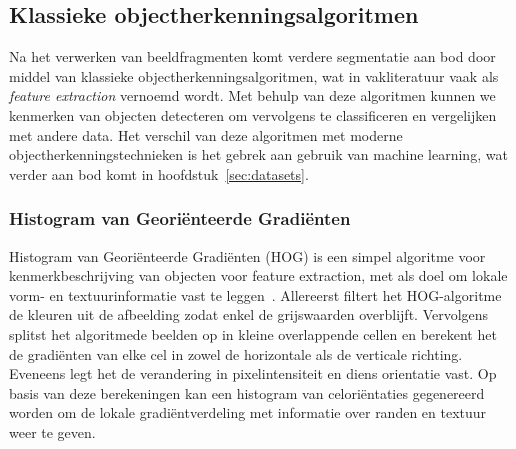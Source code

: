 
\subsection{Klassieke objectherkenningsalgoritmen}
\label{subsec:klassieke-objectherkenningsalgoritmen}
Na het verwerken van beeldfragmenten komt verdere segmentatie aan bod door middel van klassieke objectherkenningsalgoritmen, wat in vakliteratuur vaak als \textit{feature extraction} vernoemd wordt.
Met behulp van deze algoritmen kunnen we kenmerken van objecten detecteren om vervolgens te classificeren en vergelijken met andere data.
Het verschil van deze algoritmen met moderne objectherkenningstechnieken is het gebrek aan gebruik van machine learning, wat verder aan bod komt in hoofdstuk~\ref{sec:datasets}.

\subsubsection{Histogram van Georiënteerde Gradiënten}
Histogram van Geori\"enteerde Gradi\"enten (HOG) is een simpel algoritme voor kenmerkbeschrijving van objecten voor feature extraction, met als doel om lokale vorm- en textuurinformatie vast te leggen~\autocite{Saher2023}.
Allereerst filtert het HOG-algoritme de kleuren uit de afbeelding zodat enkel de grijswaarden overblijft.
Vervolgens splitst het algoritmede beelden op in kleine overlappende cellen en berekent het de gradi\"enten van elke cel in zowel de horizontale als de verticale richting.
Eveneens legt het de verandering in pixelintensiteit en diens orientatie vast.
Op basis van deze berekeningen kan een histogram van celori\"entaties gegenereerd worden om de lokale gradi\"entverdeling met informatie over randen en textuur weer te geven.

